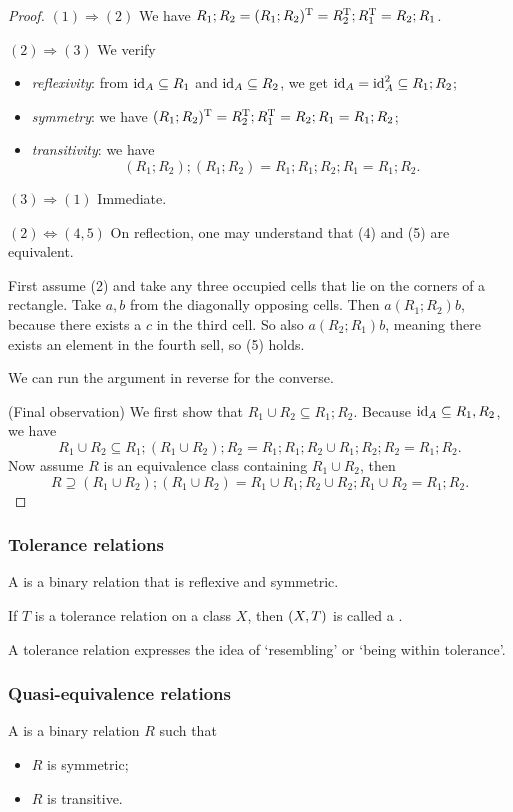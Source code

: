 \begin{proof}
$(1)\Rightarrow (2)$ We have $R_1;R_2 = (R_1;R_2)^{\mathrm{T}} = R_2^{\mathrm{T}}; R_1^{\mathrm{T}} = R_2;R_1$.

$(2)\Rightarrow (3)$ We verify
\begin{itemize}
\item \emph{reflexivity}: from $\operatorname{id}_A \subseteq R_1$ and $\operatorname{id}_A \subseteq R_2$, we get $\operatorname{id}_A = \operatorname{id}_A^2 \subseteq R_1;R_2$;
\item \emph{symmetry}: we have $(R_1;R_2)^{\mathrm{T}} = R_2^{\mathrm{T}}; R_1^{\mathrm{T}} = R_2;R_1 = R_1;R_2$;
\item \emph{transitivity}: we have
\[ (R_1;R_2);(R_1; R_2) = R_1;R_1;R_2;R_1 = R_1;R_2. \]
\end{itemize}

$(3)\Rightarrow (1)$ Immediate.

$(2)\Leftrightarrow (4, 5)$ On reflection, one may understand that (4) and (5) are equivalent.

First assume (2) and take any three occupied cells that lie on the corners of a rectangle. Take $a,b$ from the diagonally opposing cells. Then $a(R_1;R_2)b$, because there exists a $c$ in the third cell. So also $a(R_2;R_1)b$, meaning there exists an element in the fourth sell, so (5) holds.

We can run the argument in reverse for the converse.

(Final observation) We first show that $R_1\cup R_2 \subseteq R_1;R_2$. Because $\operatorname{id}_A \subseteq R_1, R_2$, we have
\[ R_1\cup R_2 \subseteq R_1;(R_1\cup R_2);R_2 = R_1;R_1;R_2 \cup R_1;R_2;R_2 = R_1;R_2. \]
Now assume $R$ is an equivalence class containing $R_1\cup R_2$, then
\[ R \supseteq (R_1\cup R_2);(R_1\cup R_2) = R_1 \cup R_1;R_2 \cup R_2;R_1 \cup R_2 = R_1;R_2. \]
\end{proof}


\subsubsection{Tolerance relations}
\begin{definition}
A  is a binary relation that is reflexive and symmetric.

If $T$ is a tolerance relation on a class $X$, then $\sSet{X,T}$ is called a .
\end{definition}
A tolerance relation expresses the idea of `resembling' or `being within tolerance'.

\subsubsection{Quasi-equivalence relations}
\begin{definition}
A  is a binary relation $R$ such that
\begin{itemize}
\item $R$ is symmetric;
\item $R$ is transitive.
\end{itemize}
\end{definition}

